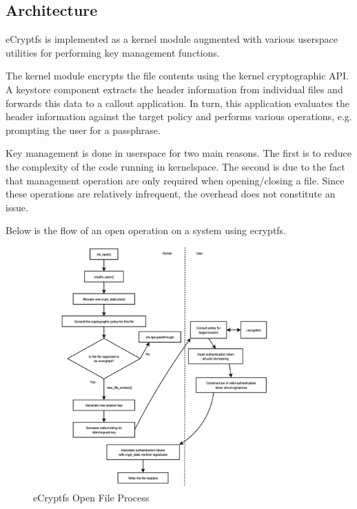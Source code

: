 \subsection{Architecture}
\label{sub-sec:arch-ecryptfs}

eCryptfs is implemented as a kernel module augmented with various userspace utilities for performing key management functions.


The kernel module encrypts the file contents using the kernel cryptographic API. A keystore component extracts the header information from individual files and forwards this data to a callout application. In turn, this application evaluates the header information against the target policy and performs various operations, e.g. prompting the user for a passphrase.

Key management is done in userspace for two main reasons. The first is to reduce the complexity of the code running in kernelspace. The second is due to the fact that management operation are only required when opening/closing a file. Since these operations are relatively infrequent, the overhead does not constitute an issue.

Below is the flow of an open operation on a system using ecryptfs.

\begin{figure}[h!]
\centering
    \includegraphics[width=0.9\textwidth]{src/img/ecryptfs/newfile.png}
\caption{eCryptfs Open File Process\cite{ecryptfs-paper}}
\end{figure}


